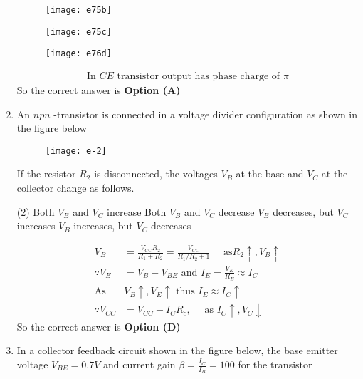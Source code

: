 \begin{enumerate}
\begin{tasks}
\begin{figure}[H]
	\texttt{[image: e75b]}
\end{figure}
\task[\textbf{C.}] \begin{figure}[H]
	\centering
	\texttt{[image: e75c]}
\end{figure}
\task[\textbf{D.}] \begin{figure}[H]
	\centering
	\texttt{[image: e76d]}
\end{figure}
\end{tasks}
\begin{answer}
\begin{align*}
\text{In $CE$ transistor output has phase charge of $\pi$}
\end{align*}
So the correct answer is \textbf{Option (A)}
\end{answer}
	\item An $npn$ -transistor is connected in a voltage divider configuration as shown in the figure below\\
	\begin{figure}[H]
		\centering
		\texttt{[image: e-2]}
	\end{figure}
	If the resistor $R_{2}$ is disconnected, the voltages $V_{B}$ at the base and $V_{C}$ at the collector change as follows.
{	}
\begin{tasks}(2)
\task[\textbf{A.}]  Both $V_{B}$ and $V_{C}$ increase
\task[\textbf{B.}] Both $V_{B}$ and $V_{C}$ decrease
\task[\textbf{C.}]  $V_{B}$ decreases, but $V_{C}$ increases
\task[\textbf{D.}] $V_{B}$ increases, but $V_{C}$ decreases
\end{tasks}
\begin{answer}
\begin{align*}
V_{B}&=\frac{V_{C C} R_{2}}{R_{1}+R_{2}}=\frac{V_{C C}}{R_{1} / R_{2}+1} \quad\text{ as} R_{2} \uparrow, V_{B} \uparrow\\
\because V_{E}&=V_{B}-V_{B E}\text{ and }I_{E}=\frac{V_{E}}{R_{E}} \approx I_{C}\\
\text{As }&V_{B} \uparrow, V_{E} \uparrow\text{ thus }I_{E} \approx I_{C} \uparrow\\
\because V_{C C}&=V_{C C}-I_{C} R_{c}, \quad\text{ as }I_{C} \uparrow, V_{C} \downarrow
\end{align*}
So the correct answer is \textbf{Option (D)}
\end{answer}
	\item In a collector feedback circuit shown in the figure below, the base emitter voltage $V_{B E}=0.7 V$ and current gain $\beta=\frac{I_{C}}{I_{B}}=100$ for the transistor\\

\end{enumerate}
